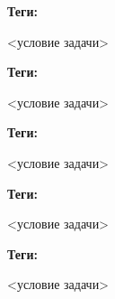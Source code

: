 \documentclass[idxtotoc,hyperref,openany,oneside]{files/admin} %
\begin{document}


\textbf{Теги:} \vspace{\baselineskip}

\begin{tcolorbox}
<условие задачи>
\end{tcolorbox}




\textbf{Теги:} \vspace{\baselineskip}

\begin{tcolorbox}
<условие задачи>
\end{tcolorbox}



\textbf{Теги:} \vspace{\baselineskip}

\begin{tcolorbox}
<условие задачи>
\end{tcolorbox}




\textbf{Теги:} \vspace{\baselineskip}

\begin{tcolorbox}
<условие задачи>
\end{tcolorbox}




\textbf{Теги:} \vspace{\baselineskip}

\begin{tcolorbox}
<условие задачи>
\end{tcolorbox}

\end{document}
